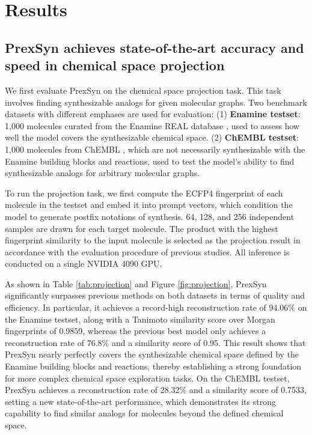 \section{Results}
\label{sec:results}

\subsection{PrexSyn achieves state-of-the-art accuracy and speed in chemical space projection}
\label{sec:results:projection}


We first evaluate PrexSyn on the chemical space projection task.
This task involves finding synthesizable analogs for given molecular graphs.
Two benchmark datasets with different emphases \citep{luo2024projecting,gao2025generative} are used for evaluation: 
(1) \textbf{Enamine testset}: 1,000 molecules curated from the Enamine REAL database \citep{shivanyuk2007enamine}, used to assess how well the model covers the synthesizable chemical space.
(2) \textbf{ChEMBL testset}: 1,000 molecules from ChEMBL \citep{gaulton2012chembl}, which are not necessarily synthesizable with the Enamine building blocks and reactions, used to test the model's ability to find synthesizable analogs for arbitrary molecular graphs.

To run the projection task, we first compute the ECFP4 fingerprint of each molecule in the testset and embed it into prompt vectors, which condition the model to generate postfix notations of synthesis.
64, 128, and 256 independent samples are drawn for each target molecule. The product with the highest fingerprint similarity to the input molecule is selected as the projection result in accordance with the evaluation procedure of previous studies.
All inference is conducted on a single NVIDIA 4090 GPU.

As shown in Table \ref{tab:projection} and Figure \ref{fig:projection}, PrexSyn significantly surpasses previous methods on both datasets in terms of quality and efficiency.
In particular, it achieves a record-high reconstruction rate of 94.06\% on the Enamine testset, along with a Tanimoto similarity score over Morgan fingerprints of 0.9859, whereas the previous best model only achieves a reconstruction rate of 76.8\% and a similarity score of 0.95. 
This result shows that PrexSyn nearly perfectly covers the synthesizable chemical space defined by the Enamine building blocks and reactions, thereby establishing a strong foundation for more complex chemical space exploration tasks.
On the ChEMBL testset, PrexSyn achieves a reconstruction rate of 28.32\% and a similarity score of 0.7533, setting a new state-of-the-art performance, which demonstrates its strong capability to find similar analogs for molecules beyond the defined chemical space.

